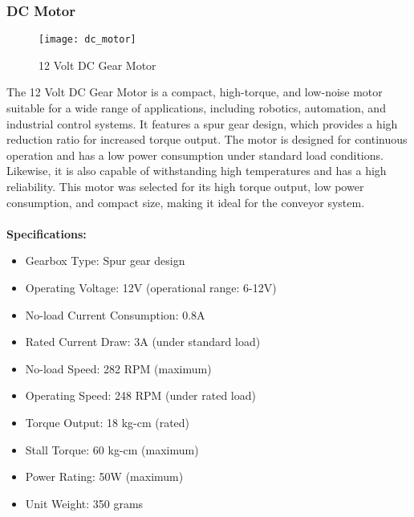 \subsubsection{DC Motor}
\begin{figure}[!htbp]
	\centering
	\texttt{[image: dc\_motor]}
	\caption{12 Volt DC Gear Motor}
	\label{fig:dc_motor_fig}
\end{figure}
The 12 Volt DC Gear Motor is a compact, high-torque, and low-noise motor suitable for a 
wide range of applications, including robotics, automation, and industrial control systems. 
It features a spur gear design, which provides a high reduction ratio for increased torque output. 
The motor is designed for continuous operation and has a low power consumption under standard load 
conditions. Likewise, it is also capable of withstanding high temperatures and has a high reliability.
This motor was selected for its high torque output, low power consumption, and compact size, 
making it ideal for the conveyor system.
\\
\\
\textbf{Specifications:}
\begin{itemize}
    \item Gearbox Type: Spur gear design
    \item Operating Voltage: 12V (operational range: 6-12V)
    \item No-load Current Consumption: 0.8A
    \item Rated Current Draw: 3A (under standard load)
    \item No-load Speed: 282 RPM (maximum)
    \item Operating Speed: 248 RPM (under rated load)
    \item Torque Output: 18 kg-cm (rated)
    \item Stall Torque: 60 kg-cm (maximum)
    \item Power Rating: 50W (maximum)
    \item Unit Weight: 350 grams
\end{itemize}


